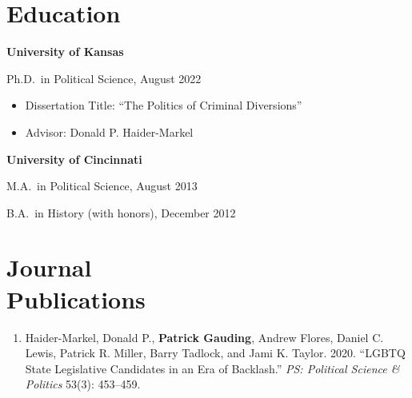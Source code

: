 \documentclass[margin,line,pifont,palatino,courier]{res}
\newenvironment{list1}{
  \begin{list}{\ding{113}}{%
      \setlength{\itemsep}{0in}
      \setlength{\parsep}{0in} \setlength{\parskip}{0in}
      \setlength{\topsep}{0in} \setlength{\partopsep}{0in}
      \setlength{\leftmargin}{0.17in}}}{\end{list}}
\newenvironment{list2}{
  \begin{list}{$\bullet$}{%
      \setlength{\itemsep}{0in}
      \setlength{\parsep}{0in} \setlength{\parskip}{0in}
      \setlength{\topsep}{0in} \setlength{\partopsep}{0in}
      \setlength{\leftmargin}{0.2in}}}{\end{list}}
\begin{document}
\begin{resume}
\section{\sc Education}

{\bf University of Kansas}\\
\begin{list1}
\item[] Ph.D.~in Political Science, August 2022
  \begin{itemize}
    \vspace*{.05in}
  \item Dissertation Title: ``The Politics of Criminal Diversions''
  \item Advisor: Donald P. Haider-Markel
  \end{itemize}
\end{list1}

{\bf University of Cincinnati}\\
\begin{list1}
\item[] M.A.~in Political Science, August 2013
\item[] B.A.~in History (with honors), December 2012


\end{list1}

\section{\sc Journal \\Publications}

\begin{enumerate}

\item Haider-Markel, Donald P., \textbf{Patrick Gauding}, Andrew Flores,
Daniel C. Lewis, Patrick R. Miller, Barry Tadlock, and Jami
K. Taylor. 2020. ``LGBTQ State Legislative Candidates in an Era
of Backlash.'' \emph{PS: Political Science \& Politics} 53(3): 453--459.


\end{enumerate}


\end{resume}
\end{document}
